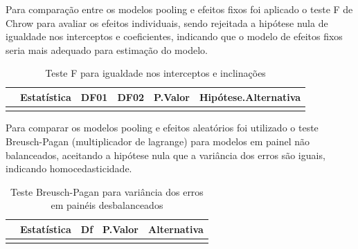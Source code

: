 \documentclass[
  12pt,
  12pt,
  openright,
  oneside,
  a4paper,
  chapter=TITLE,
  section=TITLE,
  subsection=TITLE,
  subsubsection=TITLE,
  english,
  portugues,
  sumario=tradicional]{abntex2}
\begin{document}
\begin{apendicesenv}
Para comparação entre os modelos pooling e efeitos fixos foi aplicado o teste F de Chrow para avaliar os efeitos individuais, sendo rejeitada a hipótese nula de igualdade nos interceptos e coeficientes, indicando que o modelo de efeitos fixos seria mais adequado para estimação do modelo. 

\vspace{20pt}

\begin{table}[!hbtp]
\caption{Teste F para igualdade nos interceptos e inclinações}
\vspace{1mm}
\begingroup\fontsize{10}{12}\selectfont

\begin{tabu} to 
\toprule
  & Estatística & DF01 & DF02 & P.Valor & Hipótese.Alternativa\\
\midrule
{} &  &  &  &  & \\
\bottomrule
\end{tabu}
\endgroup{}
\vspace{-1mm}
\label{tb:pftest}
\vspace{-2mm}
\end{table}

Para comparar os modelos pooling e efeitos aleatórios foi utilizado o teste Breusch-Pagan (multiplicador de lagrange) para modelos em painel não balanceados, aceitando a hipótese nula que a variância dos erros são iguais, indicando homocedasticidade.  

\vspace{20pt}

\begin{table}[!hbtp]
\caption{Teste Breusch-Pagan para variância dos erros em painéis desbalanceados}
\vspace{1mm}
\begingroup\fontsize{10}{12}\selectfont

\begin{tabu} to 
\toprule
  & Estatística & Df & P.Valor & Alternativa\\
\midrule
{} &  &  &  & \\
\bottomrule
\end{tabu}
\endgroup{}
\vspace{-1mm}
\label{tb:lbptest}
\vspace{-2mm}
\end{table}


\end{apendicesenv}
\end{document}
